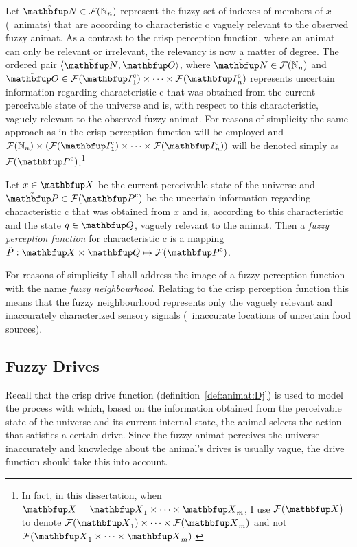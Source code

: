 Let $\fset{N} \in \fpowset{\N_n}$ represent the fuzzy set of indexes of members of $x$ (\ie\ animats) that are according to characteristic $\mathrm{c}$ vaguely relevant to the observed fuzzy animat. As a contrast to the crisp perception function, where an animat can only be relevant or irrelevant, the relevancy is now a matter of degree. The ordered pair $\langle\fset{N},\fset{O}\rangle$, where $\fset{N} \in \fpowset{\N_n}$ and $\fset{O} \in \fpowset{\set{I}^\textnormal{c}_1} \times \cdots \times \fpowset{\set{I}^\textnormal{c}_n}$ represents uncertain information regarding characteristic $\mathrm{c}$ that was obtained from the current perceivable state of the universe and is, with respect to this characteristic, vaguely relevant to the observed fuzzy animat. For reasons of simplicity the same approach as in the crisp perception function will be employed and $\fpowset{\N_n} \times (\fpowset{\set{I}^\textnormal{c}_1} \times \cdots \times \fpowset{\set{I}^\textnormal{c}_n})$ will be denoted simply as $\fpowset{\set{P}^\textnormal{c}}$.\footnote{In fact, in this dissertation, when $\set{X}=\set{X}_1 \times \cdots \times \set{X}_m$, I use $\fpowset{\set{X}}$ to denote $\fpowset{\set{X}_1} \times \cdots \times \fpowset{\set{X}_m}$ and not $\fpowset{\set{X}_1 \times \cdots \times \set{X}_m}$.}

\begin{definition}
\label{def:fuzzyAnimat:Pi}
Let $x \in \set{X}$ be the current perceivable state of the universe and $\fset{P} \in \fpowset{\set{P}^\textnormal{c}}$ be the uncertain information regarding characteristic $\mathrm{c}$ that was obtained from $x$ and is, according to this characteristic and the state $q \in \set{Q}$, vaguely relevant to the animat. Then a \emph{fuzzy perception function} for characteristic $\mathrm{c}$ is a mapping $\ffunc{P}: \set{X} \times \set{Q} \mapsto \fpowset{\set{P}^\textnormal{c}}$.
\end{definition}

For reasons of simplicity I shall address the image of a fuzzy perception function with the name \emph{fuzzy neighbourhood}. Relating to the crisp perception function this means that the fuzzy neighbourhood represents only the vaguely relevant and inaccurately characterized sensory signals (\eg\ inaccurate locations of uncertain food sources). 

\subsection{Fuzzy Drives}
Recall that the crisp drive function (definition~\ref{def:animat:Dj}) is used to model the process with which, based on the information obtained from the perceivable state of the universe and its current internal state, the animal selects the action that satisfies a certain drive. Since the fuzzy animat perceives the universe inaccurately and knowledge about the animal's drives is usually vague, the drive function should take this into account.

